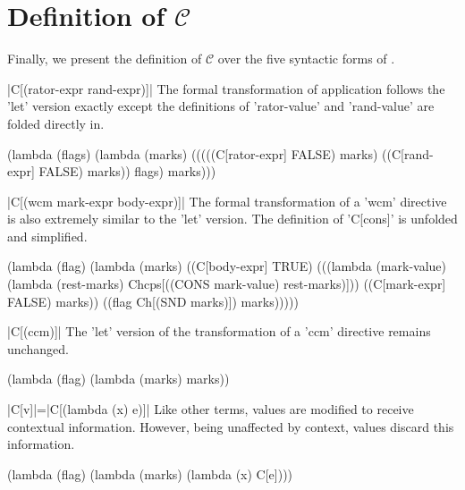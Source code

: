 \section{Definition of $\mathcal{C}$}

Finally, we present the definition of $\mathcal{C}$ over the five syntactic forms of \cm.

\begin{schemedefinition}{\scheme|C[(rator-expr rand-expr)]|}
\noindent
The formal transformation of application follows the \scheme'let' version exactly except the definitions of \scheme'rator-value' and \scheme'rand-value' are folded directly in.
\begin{schemeblock}
\begin{schemedisplay}
(lambda (flags)
  (lambda (marks)
    (((((C[rator-expr] FALSE) marks)
       ((C[rand-expr] FALSE) marks))
      flags)
     marks)))
\end{schemedisplay}
\end{schemeblock}
\end{schemedefinition}

\begin{schemedefinition}{\scheme|C[(wcm mark-expr body-expr)]|}
\noindent
The formal transformation of a \scheme'wcm' directive is also extremely similar to the \scheme'let' version. The definition of \scheme'C[cons]' is unfolded and simplified.
\begin{schemeblock}
\begin{schemedisplay}
(lambda (flag)
  (lambda (marks)
    ((C[body-expr] TRUE)
     (((lambda (mark-value) (lambda (rest-marks) Chcps[((CONS mark-value) rest-marks)]))
       ((C[mark-expr] FALSE) marks))
      ((flag Ch[(SND marks)]) marks)))))
\end{schemedisplay}
\end{schemeblock}
\end{schemedefinition}

\begin{schemedefinition}{\scheme|C[(ccm)]|}
\noindent
The \scheme'let' version of the transformation of a \scheme'ccm' directive remains unchanged.
\begin{schemeblock}
\begin{schemedisplay}
(lambda (flag)
  (lambda (marks)
    marks))
\end{schemedisplay}
\end{schemeblock}
\end{schemedefinition}

\begin{schemedefinition}{\scheme|C[v]|=\scheme|C[(lambda (x) e)]|}
\noindent
Like other terms, values are modified to receive contextual information. However, being unaffected by context, values discard this information.
\begin{schemeblock}
\begin{schemedisplay}
(lambda (flag)
  (lambda (marks)
    (lambda (x) C[e])))
\end{schemedisplay}
\end{schemeblock}
\end{schemedefinition}

